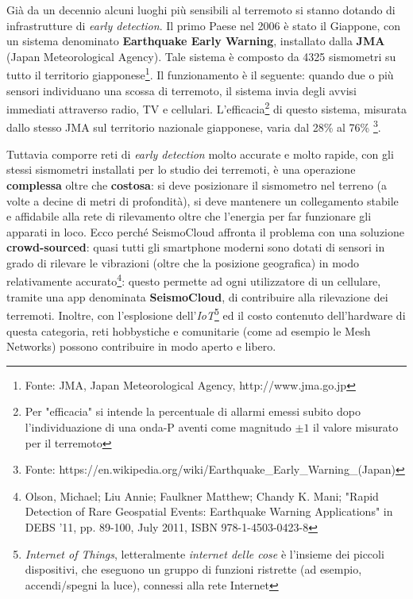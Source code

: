 \documentclass[a4paper,10pt]{memoir}
\begin{document}
Già da un decennio alcuni luoghi più sensibili al terremoto si stanno dotando di infrastrutture di \textit{early detection}. Il primo Paese nel 2006 è stato il Giappone, con un sistema denominato \textbf{Earthquake Early Warning}, installato dalla \textbf{JMA} (Japan Meteorological Agency). Tale sistema è composto da 4325 sismometri su tutto il territorio giapponese\footnote{Fonte: JMA, Japan Meteorological Agency, http://www.jma.go.jp}. Il funzionamento è il seguente: quando due o più sensori individuano una scossa di terremoto, il sistema invia degli avvisi immediati attraverso radio, TV e cellulari. L'efficacia\footnote{Per "efficacia" si intende la percentuale di allarmi emessi subito dopo l'individuazione di una onda-P aventi come magnitudo $\pm1$ il valore misurato per il terremoto} di questo sistema, misurata dallo stesso JMA sul territorio nazionale giapponese, varia dal 28\% al 76\% \footnote{Fonte: https://en.wikipedia.org/wiki/Earthquake\_Early\_Warning\_(Japan)}.

Tuttavia comporre reti di \textit{early detection} molto accurate e molto rapide, con gli stessi sismometri installati per lo studio dei terremoti, è una operazione \textbf{complessa} oltre che \textbf{costosa}: si deve posizionare il sismometro nel terreno (a volte a decine di metri di profondità), si deve mantenere un collegamento stabile e affidabile alla rete di rilevamento oltre che l'energia per far funzionare gli apparati in loco. Ecco perché SeismoCloud affronta il problema con una soluzione \textbf{crowd-sourced}: quasi tutti gli smartphone moderni sono dotati di sensori in grado di rilevare le vibrazioni (oltre che la posizione geografica) in modo relativamente accurato\footnote{Olson, Michael; Liu Annie; Faulkner Matthew; Chandy K. Mani; "Rapid Detection of Rare Geospatial Events: Earthquake Warning Applications" in DEBS '11, pp. 89-100, July 2011, ISBN 978-1-4503-0423-8}: questo permette ad ogni utilizzatore di un cellulare, tramite una app denominata \textbf{SeismoCloud}, di contribuire alla rilevazione dei terremoti. Inoltre, con l'esplosione dell'\textit{IoT}\footnote{\textit{Internet of Things}, letteralmente \textit{internet delle cose} è l'insieme dei piccoli dispositivi, che eseguono un gruppo di funzioni ristrette (ad esempio, accendi/spegni la luce), connessi alla rete Internet} ed il costo contenuto dell'hardware di questa categoria, reti hobbystiche e comunitarie (come ad esempio le Mesh Networks) possono contribuire in modo aperto e libero.

\pagebreak
%
%
\end{document}
